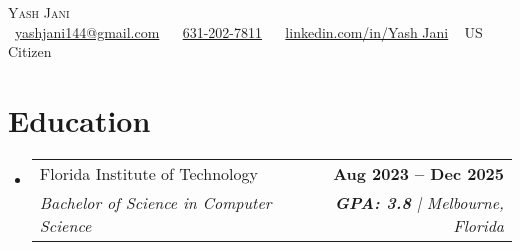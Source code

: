 \documentclass[letterpaper,11pt]{article}
\makeatletter
\newcommand{\resumeSubheading}[4]{
  \vspace{-2pt}\item
    \begin{tabular*}{1.0\textwidth}[t]{l@{\extracolsep{\fill}}r}
      \small#1 & \textbf{\small #2} \\
      \textit{\small#3} & \textit{\small #4} \\
    \end{tabular*}\vspace{-9pt}
}
\newcommand{\resumeSubHeadingListStart}{\begin{itemize}[leftmargin=0.0in, label={}]}
\newcommand{\resumeSubHeadingListEnd}{\end{itemize}}
\makeatother
\begin{document}
\begin{center}
  {\Huge \scshape Yash Jani} \\ \vspace{1pt}
    \small
    \raisebox{-0.2\height}{\faEnvelope}~\href{mailto:yashjani144@gmail.com}{yashjani144@gmail.com} ~
    \raisebox{-0.1\height}{\faPhone}~\href{tel:6312027811}{631-202-7811} ~
    \raisebox{-0.2\height}{\faLinkedin}~\href{https://www.linkedin.com/in/yash-jani-8245bb26a/}{linkedin.com/in/Yash Jani} ~
    US Citizen
    \vspace{-10pt}
\end{center}

\section{Education}
  \resumeSubHeadingListStart
    \resumeSubheading      
      {Florida Institute of Technology}{Aug 2023 -- Dec 2025}
      {Bachelor of Science in Computer Science}{\textbf{GPA: 3.8} | Melbourne, Florida}
  \resumeSubHeadingListEnd
  \vspace{-5pt}
  
\end{document}
